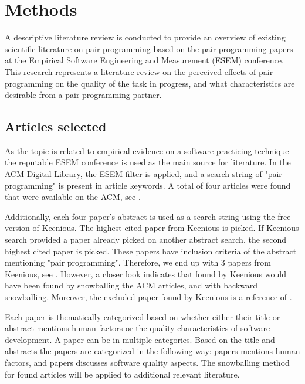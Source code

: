 \documentclass[conference]{IEEEtran}
\begin{document}
\section{Methods}

A descriptive literature review is conducted to provide an overview of existing scientific literature on pair programming based on the pair programming papers at the Empirical Software Engineering and Measurement (ESEM) conference. This research represents a literature review on the perceived effects of pair programming on the quality of the task in progress, and what characteristics are desirable from a pair programming partner. 

\subsection{Articles selected}

As the topic is related to empirical evidence on a software practicing technique the reputable ESEM conference is used as the main source for literature. In the ACM Digital Library, the ESEM filter is applied, and a search string of "pair programming" is present in article keywords. A total of four articles were found that were available on the ACM, see \cite{10.1145/2652524.2652529, 10.1145/1414004.1414026, 10.1145/1852786.1852816, 10.1145/1159733.1159749}.

Additionally, each four paper's abstract is used as a search string using the free version of Keenious. The highest cited paper from Keenious is picked. If Keenious search provided a paper already picked on another abstract search, the second highest cited paper is picked. These papers have inclusion criteria of the abstract mentioning "pair programming". Therefore, we end up with 3 papers from Keenious, see \cite{Williams2000Strengthening, Arisholm2007Evaluating, Hannay2009effectiveness}. However, a closer look indicates that \cite{Williams2000Strengthening, Arisholm2007Evaluating} found by Keenious would have been found by snowballing the ACM articles, and \cite{Hannay2009effectiveness} with backward snowballing. Moreover, the excluded paper \cite{ChamorroPremuzic2003Personality} found by Keenious is a reference of \cite{10.1145/1852786.1852816}.

Each paper is thematically categorized based on whether either their title or abstract mentions human factors or the quality characteristics of software development. A paper can be in multiple categories. Based on the title and abstracts the papers are categorized in the following way: papers \cite{10.1145/2652524.2652529, Williams2000Strengthening, 10.1145/1414004.1414026, Arisholm2007Evaluating, 10.1145/1852786.1852816, Hannay2009effectiveness} mentions human factors, and papers \cite{Williams2000Strengthening, 10.1145/1414004.1414026, Arisholm2007Evaluating, 10.1145/1159733.1159749, Hannay2009effectiveness} discusses software quality aspects. The snowballing method for found articles will be applied to additional relevant literature.
\end{document}
